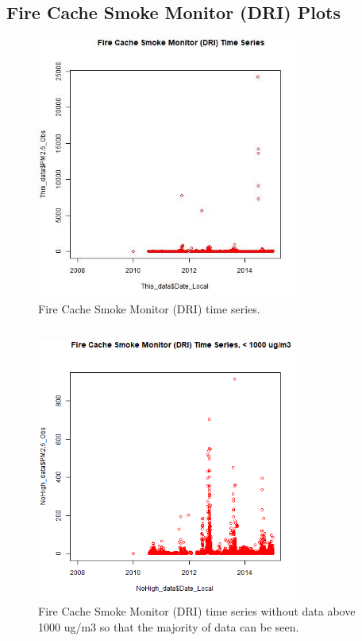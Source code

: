 
\subsection{Fire Cache Smoke Monitor (DRI) Plots}
\begin{figure} 
\centering 
\includegraphics[width=0.77\textwidth]{Code_Outputs/FireCacheDRI_time_series.jpg} 
\caption{\label{fig:FireCacheDRITS}Fire Cache Smoke Monitor (DRI) time series.} 
\end{figure} 
 

\subsection{}
\begin{figure} 
\centering 
\includegraphics[width=0.77\textwidth]{Code_Outputs/FireCacheDRI_time_series_below_1000ugm3.png} 
\caption{\label{fig:FireCacheDRITSnoHigh}Fire Cache Smoke Monitor (DRI) time series without data above 1000 ug/m3 so that the majority of data can be seen.} 
\end{figure} 
 

